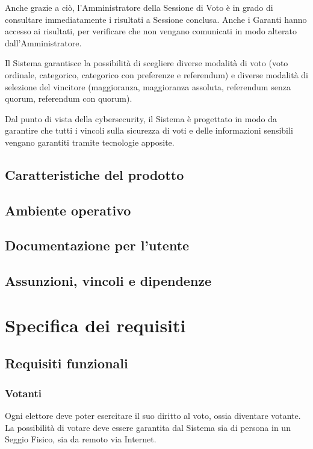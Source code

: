 \documentclass{report}
\begin{document}
Anche grazie a ciò, l'Amministratore della Sessione di Voto è in grado di consultare immediatamente i risultati a Sessione conclusa. Anche i Garanti hanno accesso ai risultati, per verificare che non vengano comunicati in modo alterato dall'Amministratore.

Il Sistema garantisce la possibilità di scegliere diverse modalità di voto (voto ordinale, categorico, categorico con preferenze e referendum) e diverse modalità di selezione del vincitore (maggioranza, maggioranza assoluta, referendum senza quorum, referendum con quorum).

Dal punto di vista della cybersecurity, il Sistema è progettato in modo da garantire che tutti i vincoli sulla sicurezza di voti e delle informazioni sensibili vengano garantiti tramite tecnologie apposite.


\section{Caratteristiche del prodotto}




\section{Ambiente operativo}




\section{Documentazione per l'utente}




\section{Assunzioni, vincoli e dipendenze}






\chapter{Specifica dei requisiti}




\section{Requisiti funzionali}


\subsection{Votanti}
Ogni elettore deve poter esercitare il suo diritto al voto, ossia diventare votante. La possibilità di votare deve essere garantita dal Sistema sia di persona in un Seggio Fisico, sia da remoto via Internet.
\end{document}
